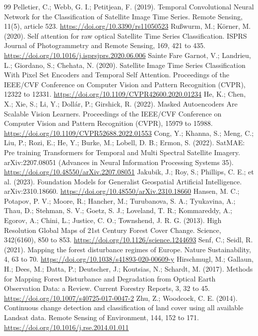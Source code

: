 \documentclass[11pt,a4paper]{article}
\begin{document}
\begin{thebibliography}{99}
 Pelletier, C.; Webb, G. I.; Petitjean, F. (2019). Temporal Convolutional Neural Network for the Classification of Satellite Image Time Series. Remote Sensing, 11(5), article 523. \url{https://doi.org/10.3390/rs11050523}
 Rußwurm, M.; Körner, M. (2020). Self attention for raw optical Satellite Time Series Classification. ISPRS Journal of Photogrammetry and Remote Sensing, 169, 421 to 435. \url{https://doi.org/10.1016/j.isprsjprs.2020.06.006}
 Sainte Fare Garnot, V.; Landrieu, L.; Giordano, S.; Chehata, N. (2020). Satellite Image Time Series Classification With Pixel Set Encoders and Temporal Self Attention. Proceedings of the IEEE/CVF Conference on Computer Vision and Pattern Recognition (CVPR), 12322 to 12331. \url{https://doi.org/10.1109/CVPR42600.2020.01234}
 He, K.; Chen, X.; Xie, S.; Li, Y.; Dollár, P.; Girshick, R. (2022). Masked Autoencoders Are Scalable Vision Learners. Proceedings of the IEEE/CVF Conference on Computer Vision and Pattern Recognition (CVPR), 15979 to 15988. \url{https://doi.org/10.1109/CVPR52688.2022.01553}
 Cong, Y.; Khanna, S.; Meng, C.; Liu, P.; Rozi, E.; He, Y.; Burke, M.; Lobell, D. B.; Ermon, S. (2022). SatMAE: Pre training Transformers for Temporal and Multi Spectral Satellite Imagery. arXiv:2207.08051 (Advances in Neural Information Processing Systems 35). \url{https://doi.org/10.48550/arXiv.2207.08051}
 Jakubik, J.; Roy, S.; Phillips, C. E.; et al. (2023). Foundation Models for Generalist Geospatial Artificial Intelligence. arXiv:2310.18660. \url{https://doi.org/10.48550/arXiv.2310.18660}
 Hansen, M. C.; Potapov, P. V.; Moore, R.; Hancher, M.; Turubanova, S. A.; Tyukavina, A.; Thau, D.; Stehman, S. V.; Goetz, S. J.; Loveland, T. R.; Kommareddy, A.; Egorov, A.; Chini, L.; Justice, C. O.; Townshend, J. R. G. (2013). High Resolution Global Maps of 21st Century Forest Cover Change. Science, 342(6160), 850 to 853. \url{https://doi.org/10.1126/science.1244693}
 Senf, C.; Seidl, R. (2021). Mapping the forest disturbance regimes of Europe. Nature Sustainability, 4, 63 to 70. \url{https://doi.org/10.1038/s41893-020-00609-y}
 Hirschmugl, M.; Gallaun, H.; Dees, M.; Datta, P.; Deutscher, J.; Koutsias, N.; Schardt, M. (2017). Methods for Mapping Forest Disturbance and Degradation from Optical Earth Observation Data: a Review. Current Forestry Reports, 3, 32 to 45. \url{https://doi.org/10.1007/s40725-017-0047-2}
 Zhu, Z.; Woodcock, C. E. (2014). Continuous change detection and classification of land cover using all available Landsat data. Remote Sensing of Environment, 144, 152 to 171. \url{https://doi.org/10.1016/j.rse.2014.01.011}

\end{thebibliography}
\end{document}
